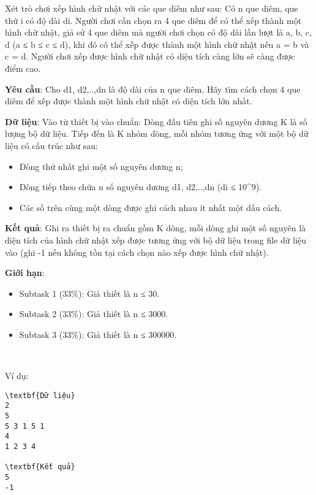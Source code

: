 

Xét trò chơi xếp hình chữ nhật với các que diêm như sau: Có n que diêm, que thứ i có độ dài di. Người chơi cần chọn ra 4 que diêm để có thể xếp thành một hình chữ nhật, giả sử 4 que diêm mà người chơi chọn có độ dài lần lượt là a, b, c, d (a ≤ b ≤ c ≤ d), khi đó có thể xếp được thành một hình chữ nhật nếu a = b và c = d. Người chơi xếp được hình chữ nhật có diện tích càng lớn sẽ càng được điểm cao.

\textbf{Yêu cầu}: Cho d1, d2,..,dn là độ dài của n que diêm. Hãy tìm cách chọn 4 que diêm để xếp được thành một hình chữ nhật có diện tích lớn nhất.

\textbf{Dữ liệu}: Vào từ thiết bị vào chuẩn: Dòng đầu tiên ghi số nguyên dương K là số lượng bộ dữ liệu. Tiếp đến là K nhóm dòng, mỗi nhóm tương ứng với một bộ dữ liệu có cấu trúc như sau:
\begin{itemize}
	\item Dòng thứ nhất ghi một số nguyên dương n;
	\item Dòng tiếp theo chứa n số nguyên dương d1, d2,..,dn (di ≤ 10\textasciicircum9).
	\item Các số trên cùng một dòng được ghi cách nhau ít nhất một dấu cách.
\end{itemize}

\textbf{Kết quả}: Ghi ra thiết bị ra chuẩn gồm K dòng, mỗi dòng ghi một số nguyên là diện tích của hình chữ nhật xếp được tương ứng với bộ dữ liệu trong file dữ liệu vào (ghi -1 nếu không tồn tại cách chọn nào xếp được hình chữ nhật).

\textbf{Giới hạn}:
\begin{itemize}
	\item Subtask 1 (33\%): Giả thiết là n ≤ 30.
	\item Subtask 2 (33\%): Giả thiết là n ≤ 3000.
	\item Subtask 3 (33\%): Giả thiết là n ≤ 300000.
\end{itemize}

 

Ví dụ:
\begin{verbatim}
\textbf{Dữ liệu}
2
5
5 3 1 5 1
4
1 2 3 4

\textbf{Kết quả}
5
-1\end{verbatim}

 